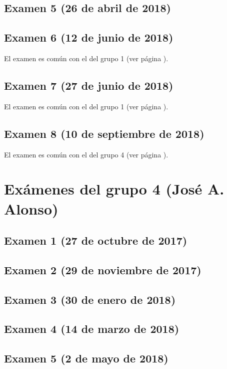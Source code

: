 \documentclass[a4paper,12pt,twoside]{book}
\begin{document}
\subsection{Examen 5 (26 de abril de 2018)}
\subsection{Examen 6 (12 de junio de 2018)}
El examen es común con el del grupo 1 (ver página \pageref{examen_17_18_1_6}).
\subsection{Examen 7 (27 de junio de 2018)}
El examen es común con el del grupo 1 (ver página \pageref{examen_17_18_4_7}).
\subsection{Examen 8 (10 de septiembre de 2018)}
El examen es común con el del grupo 4 (ver página \pageref{examen_17_18_4_8}).

\section{Exámenes del grupo 4 (José A. Alonso)}
\subsection{Examen 1 (27 de octubre de 2017)}
\subsection{Examen 2 (29 de noviembre de 2017)}
\subsection{Examen 3 (30 de enero de 2018)}
 \label{examen_17_18_4_3}
\subsection{Examen 4 (14 de marzo de 2018)}
\subsection{Examen 5 (2 de mayo de 2018)}
\end{document}
